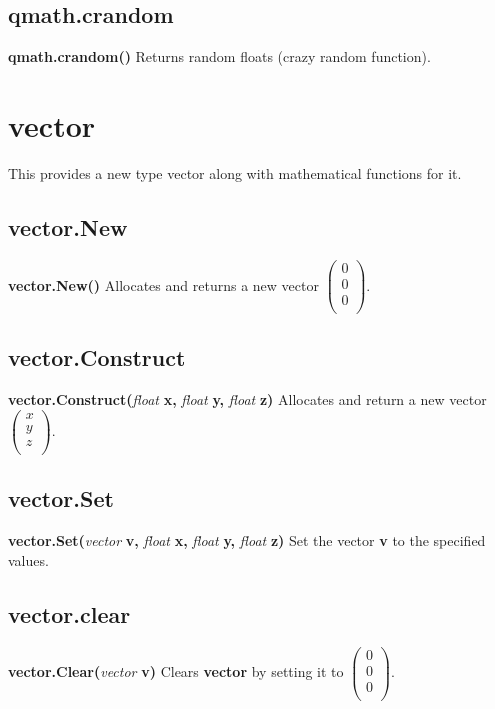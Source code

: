 \documentclass{scrreprt}
\begin{document}
\subsection{qmath.crandom}
\label{qm-crandom}
\textbf{qmath.crandom()}
\newline
Returns random floats (crazy random function).
\newpage
\section{vector}
\label{vect}
This provides a new type vector along with mathematical functions for it.
\subsection{vector.New}
\label{vect-new}
\textbf{vector.New()}
\newline
Allocates and returns a new vector \begin{math}\left(\begin{array}{c} 0 \\ 0 \\ 0 \\ \end{array}\right)\end{math}.
\subsection{vector.Construct}
\label{vect-cons}
\textbf{vector.Construct(}\textit{float}\textbf{ x, }\textit{float}\textbf{ y, }\textit{float}\textbf{ z)}
\newline
Allocates and return a new vector \begin{math}\left(\begin{array}{c} x \\ y \\ z \\  \end{array}\right)\end{math}.
\subsection{vector.Set}
\label{vect-set}
\textbf{vector.Set(}\textit{vector}\textbf{ v, }\textit{float}\textbf{ x, }\textit{float}\textbf{ y, }\textit{float}\textbf{ z)}
\newline
Set the vector \textbf{v} to the specified values.
\subsection{vector.clear}
\label{vect-clear}
\textbf{vector.Clear(}\textit{vector}\textbf{ v)}
\newline
Clears \textbf{vector} by setting it to \begin{math}\left(\begin{array}{c} 0 \\ 0 \\ 0 \\ \end{array}\right)\end{math}.
\end{document}
